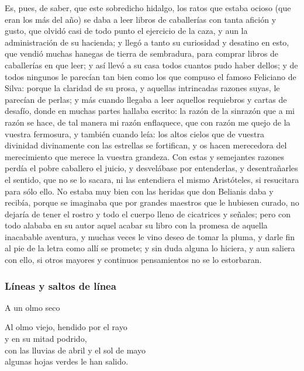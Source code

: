 \documentclass[a4paper,12pt]{article} %
\begin{document}
Es, pues, de saber, que este sobredicho hidalgo, los ratos que estaba ocioso (que eran los más del año) se daba a leer libros de caballerías con tanta afición y gusto, que olvidó casi de todo punto el ejercicio de la caza, y aun la administración de su hacienda; y llegó a tanto su curiosidad y desatino en esto, que vendió muchas hanegas de tierra de sembradura, para comprar libros de caballerías en que leer; y así llevó a su casa todos cuantos pudo haber dellos; y de todos ningunos le parecían tan bien como los que compuso el famoso Feliciano de Silva: porque la claridad de su prosa, y aquellas intrincadas razones suyas, le parecían de perlas; y más cuando llegaba a leer aquellos requiebros y cartas de desafío, donde en muchas partes hallaba escrito: la razón de la sinrazón que a mi razón se hace, de tal manera mi razón enflaquece, que con razón me quejo de la vuestra fermosura, y también cuando leía: los altos cielos que de vuestra divinidad divinamente con las estrellas se fortifican, y os hacen merecedora del merecimiento que merece la vuestra grandeza. Con estas y semejantes razones perdía el pobre caballero el juicio, y desvelábase por entenderlas, y desentrañarles el sentido, que no se lo sacara, ni las entendiera el mismo Aristóteles, si resucitara para sólo ello. No estaba muy bien con las heridas que don Belianis daba y recibía, porque se imaginaba que por grandes maestros que le hubiesen curado, no dejaría de tener el rostro y todo el cuerpo lleno de cicatrices y señales; pero con todo alababa en su autor aquel acabar su libro con la promesa de aquella inacabable aventura, y muchas veces le vino deseo de tomar la pluma, y darle fin al pie de la letra como allí se promete; y sin duda alguna lo hiciera, y aun saliera con ello, si otros mayores y continuos pensamientos no se lo estorbaran.


\subsubsection{Líneas y saltos de línea}

A un olmo seco

Al olmo viejo, hendido por el rayo \\
y en su mitad podrido, \\
con las lluvias de abril y el sol de mayo \\
algunas hojas verdes le han salido. \\
\end{document}
